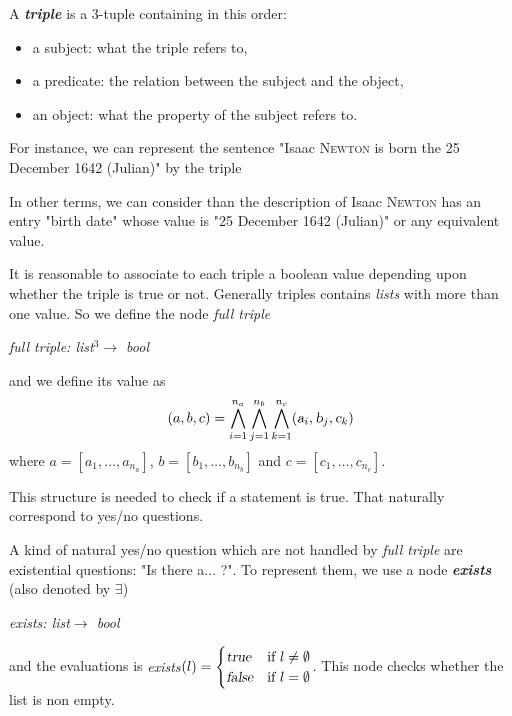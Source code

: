 A \textsl{\bf triple} is a 3-tuple containing in this order:
\begin{itemize}
    \item a subject: what the triple refers to,
    \item a predicate: the relation between the subject and the object,
    \item an object: what the property of the subject refers to.
\end{itemize}
For instance, we can represent the sentence "Isaac \textsc{Newton} is born the 25 December 1642 (Julian)" by the triple
\begin{figure}[!ht]
    \centering
\end{figure}
\FloatBarrier
In other terms, we can consider than the description of Isaac \textsc{Newton} has an entry "birth date" whose value is "25 December 1642 (Julian)" or any equivalent value.

It is reasonable to associate to each triple a boolean value depending upon whether the triple is true or not. Generally triples contains \textsl{lists} with more than one value. So we define the node \textsl{full triple} 
\begin{center}
\textsl{full triple: list$^3\rightarrow$ bool}
\end{center}
and we define its value as $$(a,b,c)=\bigwedge_{i=1}^{n_a}\bigwedge_{j=1}^{n_b}\bigwedge_{k=1}^{n_c} (\textsl{a}_i,\textsl{b}_j,\textsl{c}_k)$$where $a=[a_1,\ldots,a_{n_a}]$, $b=[b_1,\ldots,b_{n_b}]$ and $c=[c_1,\ldots,c_{n_c}]$.

This structure is needed to check if a statement is true. That naturally correspond to yes/no questions.

A kind of natural yes/no question which are not handled by \textsl{full triple} are existential questions: "Is there a... ?". To represent them, we use a node \textsl{\bf exists} (also denoted by $\exists$)
\begin{center}
\textsl{exists: list$\rightarrow$ bool}
\end{center}
and the evaluations is \textsl{exists$(l) = \begin{cases}
\textsl{true} & \text{if }l\neq\emptyset\\
\textsl{false} & \text{if }l=\emptyset
\end{cases}$}. This node checks whether the list is non empty.

